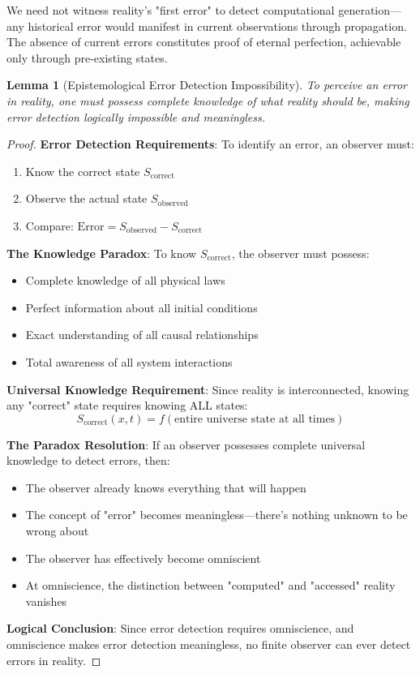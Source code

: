 \documentclass[12pt,a4paper]{article}
\newtheorem{lemma}[theorem]{Lemma}
\begin{document}
\begin{remark}
We need not witness reality's "first error" to detect computational generation—any historical error would manifest in current observations through propagation. The absence of current errors constitutes proof of eternal perfection, achievable only through pre-existing states.
\end{remark}

\begin{lemma}[Epistemological Error Detection Impossibility]
To perceive an error in reality, one must possess complete knowledge of what reality should be, making error detection logically impossible and meaningless.
\end{lemma}

\begin{proof}
\textbf{Error Detection Requirements}: To identify an error, an observer must:
\begin{enumerate}
    \item Know the correct state $S_{\text{correct}}$
    \item Observe the actual state $S_{\text{observed}}$  
    \item Compare: $\text{Error} = S_{\text{observed}} - S_{\text{correct}}$
\end{enumerate}

\textbf{The Knowledge Paradox}: To know $S_{\text{correct}}$, the observer must possess:
\begin{itemize}
    \item Complete knowledge of all physical laws
    \item Perfect information about all initial conditions
    \item Exact understanding of all causal relationships
    \item Total awareness of all system interactions
\end{itemize}

\textbf{Universal Knowledge Requirement}: Since reality is interconnected, knowing any "correct" state requires knowing ALL states:
$$S_{\text{correct}}(x,t) = f(\text{entire universe state at all times})$$

\textbf{The Paradox Resolution}: If an observer possesses complete universal knowledge to detect errors, then:
\begin{itemize}
    \item The observer already knows everything that will happen
    \item The concept of "error" becomes meaningless—there's nothing unknown to be wrong about
    \item The observer has effectively become omniscient
    \item At omniscience, the distinction between "computed" and "accessed" reality vanishes
\end{itemize}

\textbf{Logical Conclusion}: Since error detection requires omniscience, and omniscience makes error detection meaningless, no finite observer can ever detect errors in reality.
\end{proof}
\end{document}
